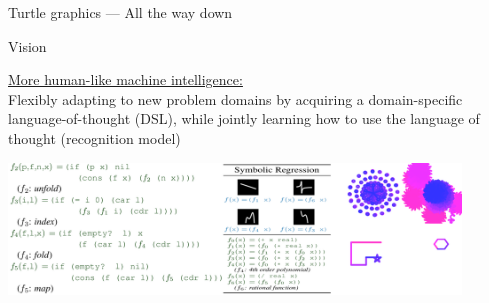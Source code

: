 \documentclass{beamer}
\begin{document}
\begin{frame}{Turtle graphics --- All the way down}
\begin{center}
{\begin{figure}
    \end{figure}
  }
\end{center}
\end{frame}

\begin{frame}{Vision}


   \underline{More human-like machine intelligence:}\\Flexibly adapting to new problem domains by
   acquiring a domain-specific language-of-thought (DSL), while jointly learning how to use the language of thought (recognition model)

   

  \pause

\hspace{-1cm}\includegraphics[width = 12cm]{figures/finale.png} 
  \end{frame}
\end{document}
